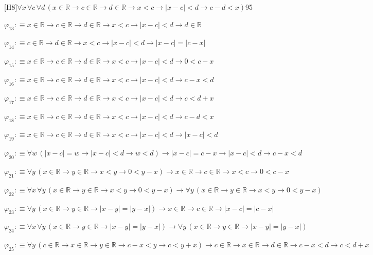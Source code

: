 \begin{fullproof}{[H8]}{$\forall x\,\forall c\,\forall d\,(x \in \mathbb{R} \to c \in \mathbb{R} \to d \in \mathbb{R} \to x < c \to \lvert x - c \rvert < d \to c - d < x)$}{95}
\begin{abbrevlist}
\item $\varphi_{13} :\equiv x \in \mathbb{R} \to c \in \mathbb{R} \to d \in \mathbb{R} \to x < c \to \lvert x - c \rvert < d \to d \in \mathbb{R}$
\item $\varphi_{14} :\equiv c \in \mathbb{R} \to d \in \mathbb{R} \to x < c \to \lvert x - c \rvert < d \to \lvert x - c \rvert = \lvert c - x \rvert$
\item $\varphi_{15} :\equiv x \in \mathbb{R} \to c \in \mathbb{R} \to d \in \mathbb{R} \to x < c \to \lvert x - c \rvert < d \to 0 < c - x$
\item $\varphi_{16} :\equiv x \in \mathbb{R} \to c \in \mathbb{R} \to d \in \mathbb{R} \to x < c \to \lvert x - c \rvert < d \to c - x < d$
\item $\varphi_{17} :\equiv x \in \mathbb{R} \to c \in \mathbb{R} \to d \in \mathbb{R} \to x < c \to \lvert x - c \rvert < d \to c < d + x$
\item $\varphi_{18} :\equiv x \in \mathbb{R} \to c \in \mathbb{R} \to d \in \mathbb{R} \to x < c \to \lvert x - c \rvert < d \to c - d < x$
\item $\varphi_{19} :\equiv x \in \mathbb{R} \to c \in \mathbb{R} \to d \in \mathbb{R} \to x < c \to \lvert x - c \rvert < d \to \lvert x - c \rvert < d$
\item $\varphi_{20} :\equiv \forall w\,(\lvert x - c \rvert = w \to \lvert x - c \rvert < d \to w < d) \to \lvert x - c \rvert = c - x \to \lvert x - c \rvert < d \to c - x < d$
\item $\varphi_{21} :\equiv \forall y\,(x \in \mathbb{R} \to y \in \mathbb{R} \to x < y \to 0 < y - x) \to x \in \mathbb{R} \to c \in \mathbb{R} \to x < c \to 0 < c - x$
\item $\varphi_{22} :\equiv \forall x\,\forall y\,(x \in \mathbb{R} \to y \in \mathbb{R} \to x < y \to 0 < y - x) \to \forall y\,(x \in \mathbb{R} \to y \in \mathbb{R} \to x < y \to 0 < y - x)$
\item $\varphi_{23} :\equiv \forall y\,(x \in \mathbb{R} \to y \in \mathbb{R} \to \lvert x - y \rvert = \lvert y - x \rvert) \to x \in \mathbb{R} \to c \in \mathbb{R} \to \lvert x - c \rvert = \lvert c - x \rvert$
\item $\varphi_{24} :\equiv \forall x\,\forall y\,(x \in \mathbb{R} \to y \in \mathbb{R} \to \lvert x - y \rvert = \lvert y - x \rvert) \to \forall y\,(x \in \mathbb{R} \to y \in \mathbb{R} \to \lvert x - y \rvert = \lvert y - x \rvert)$
\item $\varphi_{25} :\equiv \forall y\,(c \in \mathbb{R} \to x \in \mathbb{R} \to y \in \mathbb{R} \to c - x < y \to c < y + x) \to c \in \mathbb{R} \to x \in \mathbb{R} \to d \in \mathbb{R} \to c - x < d \to c < d + x$

\end{abbrevlist}
\end{fullproof}
